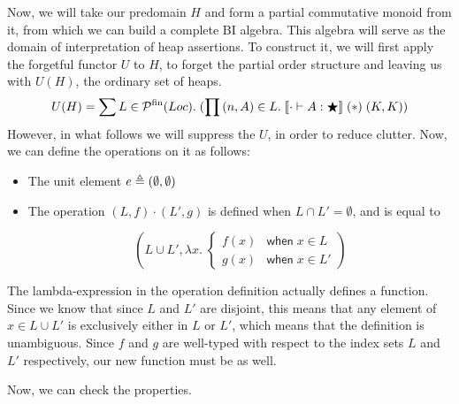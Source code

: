 Now, we will take our predomain $H$ and form a partial commutative
monoid from it, from which we can build a complete BI algebra. This
algebra will serve as the domain of interpretation of heap
assertions. To construct it, we will first apply the forgetful functor
$U$ to $H$, to forget the partial order structure and leaving us with
$U(H)$, the ordinary set of heaps.
\begin{displaymath}
U(H) = \sum L \in \powersetfin{Loc}.\; (\prod \sempair{n}{A} \in L.\;
\interp{\judgeWK[\cdot]{A}{\bigstar}}\;(*)\;(K,K))
\end{displaymath}
However, in what follows we will suppress the $U$, in order to reduce
clutter. Now, we can define the operations on it as follows:

\begin{itemize}
\item The unit element $e \triangleq \sempair{\emptyset}{\emptyset}$
\item The operation $(L, f) \cdot (L', g)$ is defined when $L \cap L' = \emptyset$, and
      is equal to 

\begin{displaymath}
 \left(L \cup L', \lambda x.\;\left\{\begin{array}{ll}
                                 f(x) & \mathsf{when}\; x \in L \\
                                 g(x) & \mathsf{when}\; x \in L'
                               \end{array}
                         \right.\right)
 \end{displaymath}
\end{itemize}

The lambda-expression in the operation definition actually defines a
function. Since we know that since $L$ and $L'$ are disjoint, this
means that any element of $x \in L \cup L'$ is exclusively either in
$L$ or $L'$, which means that the definition is unambiguous. Since $f$
and $g$ are well-typed with respect to the index sets $L$ and $L'$
respectively, our new function must be as well.

Now, we can check the properties. 

